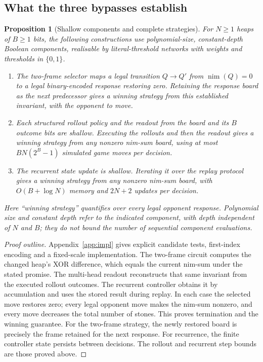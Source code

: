 \documentclass[11pt]{article}
\theoremstyle{plain}
\newtheorem{proposition}[theorem]{Proposition}
\theoremstyle{definition}
\theoremstyle{remark}
\numberwithin{equation}{section}
\begin{document}
\subsection{What the three bypasses establish}
\label{sec:bypass-scope}

\begin{proposition}[Shallow components and complete strategies]
\label{prop:bypass-interfaces}
For $N\ge1$ heaps of $B\ge1$ bits, the following constructions use polynomial-size, constant-depth Boolean components, realisable by literal-threshold networks with weights and thresholds in $\{0,1\}$.
\begin{enumerate}[leftmargin=*,label=(\roman*)]
\item The two-frame selector maps a legal transition $Q\to Q'$ from $\operatorname{nim}(Q)=0$ to a legal binary-encoded response restoring zero. Retaining the response board as the next predecessor gives a winning strategy from this established invariant, with the opponent to move.
\item Each structured rollout policy and the readout from the board and its $B$ outcome bits are shallow. Executing the rollouts and then the readout gives a winning strategy from any nonzero nim-sum board, using at most $BN(2^B-1)$ simulated game moves per decision.
\item The recurrent state update is shallow. Iterating it over the replay protocol gives a winning strategy from any nonzero nim-sum board, with $O(B+\log N)$ memory and $2N+2$ updates per decision.
\end{enumerate}
Here ``winning strategy'' quantifies over every legal opponent response. Polynomial size and constant depth refer to the indicated component, with depth independent of $N$ and $B$; they do not bound the number of sequential component evaluations.
\end{proposition}

\begin{proof}[Proof outline]
Appendix~\ref{app:impl} gives explicit candidate tests, first-index encoding and a fixed-scale implementation. The two-frame circuit computes the changed heap's XOR difference, which equals the current nim-sum under the stated promise. The multi-head readout reconstructs that same invariant from the executed rollout outcomes. The recurrent controller obtains it by accumulation and uses the stored result during replay. In each case the selected move restores zero; every legal opponent move makes the nim-sum nonzero, and every move decreases the total number of stones. This proves termination and the winning guarantee. For the two-frame strategy, the newly restored board is precisely the frame retained for the next response. For recurrence, the finite controller state persists between decisions. The rollout and recurrent step bounds are those proved above.
\end{proof}
\end{document}
